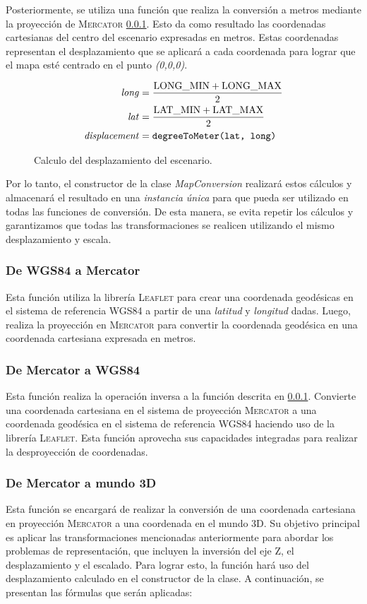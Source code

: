 \documentclass[a4paper, 11pt]{book}
\begin{document}
Posteriormente, se utiliza una función que realiza la conversión a metros mediante la proyección de \textsc{Mercator} \ref{funcion:deegreeToMeter}. Esto da como resultado las coordenadas cartesianas del centro del escenario expresadas en metros. Estas coordenadas representan el desplazamiento que se aplicará a cada coordenada para lograr que el mapa esté centrado en el punto \emph{(0,0,0)}.
\begin{figure}[h]
\begin{align*}
\text{\emph{long}} &= \frac{{\text{LONG\_MIN} + \text{LONG\_MAX}}}{2} \\
\text{\emph{lat}} &= \frac{{\text{LAT\_MIN} + \text{LAT\_MAX}}}{2} \\
\text{\emph{displacement}} &= \texttt{\text{degreeToMeter}(\text{lat}, \text{long})}
\end{align*}
\caption{Calculo del desplazamiento del escenario.}
  \label{formula:desplazamiento}
\end{figure}

Por lo tanto, el constructor de la clase \emph{MapConversion} realizará estos cálculos y almacenará el resultado en una \emph{instancia única} para que pueda ser utilizado en todas las funciones de conversión. De esta manera, se evita repetir los cálculos y garantizamos que todas las transformaciones se realicen utilizando el mismo desplazamiento y escala.
\subsubsection{De WGS84 a Mercator}
\label{funcion:deegreeToMeter}
Esta función utiliza la librería \textsc{Leaflet} para crear una coordenada geodésicas en el sistema de referencia \textsc{WGS84} a partir de una \emph{latitud} y \emph{longitud} dadas. Luego, realiza la proyección en \textsc{Mercator} para convertir la coordenada geodésica en una coordenada cartesiana expresada en metros.
\subsubsection{De Mercator a WGS84}
\label{funcion:meterToDegree}
Esta función realiza la operación inversa a la función descrita en \ref{funcion:deegreeToMeter}. Convierte una coordenada cartesiana en el sistema de proyección \textsc{Mercator} a una coordenada geodésica en el sistema de referencia \textsc{WGS84} haciendo uso de la librería \textsc{Leaflet}. Esta función aprovecha sus capacidades integradas para realizar la desproyección de coordenadas.
\subsubsection{De Mercator a mundo 3D}
\label{funcion:mercatorToWorld}
Esta función se encargará de realizar la conversión de una coordenada cartesiana en proyección \textsc{Mercator} a una coordenada en el mundo 3D. Su objetivo principal es aplicar las transformaciones mencionadas anteriormente para abordar los problemas de representación, que incluyen la inversión del eje \textsc{Z}, el desplazamiento y el escalado. Para lograr esto, la función hará uso del desplazamiento calculado en el constructor de la clase. A continuación, se presentan las fórmulas que serán aplicadas:
\end{document}
